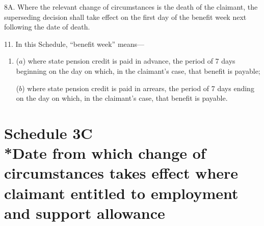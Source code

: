 \documentclass[12pt,a4paper]{article}
\begin{document}

\medskip

%
%

8A.  Where the relevant change of circumstances is the death of the claimant, the superseding decision shall take effect on the first day of the benefit week next following the date of death.

\medskip

11.  In this Schedule, “benefit week” means—
\begin{enumerate}\item[]
($a$) where state pension credit is paid in advance, the period of 7 days beginning on the day on which, in the claimant’s case, that benefit is payable;

($b$) where state pension credit is paid in arrears, the period of 7 days ending on the day on which, in the claimant’s case, that benefit is payable.
\end{enumerate}

\vfill

\part[Schedule 3C --- Date from which change of circumstances takes effect where claimant entitled to employment and support allowance]{Schedule 3C\\*Date from which change of circumstances takes effect where claimant entitled to employment and support allowance}
\end{document}
